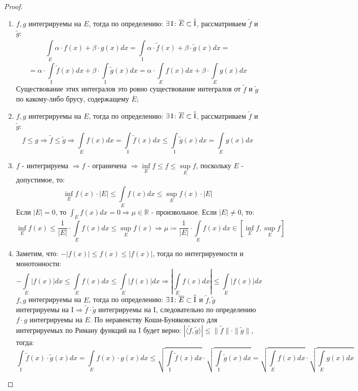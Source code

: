 \documentclass[12pt]{article}
\newcommand{\MR}{\mathbb{R}}
\newcommand{\MI}{\mathrm{I}}
\theoremstyle{definition}
\newcommand{\ddint}[2]{\displaystyle\int\limits_{#1}^{#2}}
\newcommand{\wte}[1]{\widetilde{#1}}
\newcommand{\ovl}[1]{\overline{#1}}
\newcommand{\Circ}[1]{\accentset{\circ}{#1}}
\begin{document}
\begin{proof}\hfill
	\begin{enumerate}[label=\arabic*)]
		\item $f,g$ интегрируемы на $E$, тогда по определению: $\exists \, \MI \colon \ovl{E} \subset \Circ{\MI}$, рассматриваем $\wte{f}$ и $\wte{g}$:
		$$
			\ddint{E}{}\alpha{\cdot}f(x) + \beta{\cdot}g(x)dx = \ddint{\MI}{}\alpha{\cdot}\wte{f}(x) + \beta{\cdot}\wte{g}(x)dx =  
		$$
		$$
			= \alpha{\cdot}\ddint{\MI}{}\wte{f}(x)dx + \beta{\cdot}\ddint{\MI}{}\wte{g}(x)dx = \alpha{\cdot} \ddint{E}{}f(x)dx + \beta {\cdot}\ddint{E}{}g(x)dx
		$$
		Существование этих интегралов это ровно существование интегралов от $\wte{f}$ и $\wte{g}$ по какому-либо брусу, содержащему $\ovl{E}$;
		\item  $f,g$ интегрируемы на $E$, тогда по определению: $\exists \, \MI \colon \ovl{E} \subset \Circ{\MI}$, рассматриваем $\wte{f}$ и $\wte{g}$:
		$$
			f\leq g \Rightarrow \wte{f} \leq \wte{g} \Rightarrow \ddint{E}{}f(x)dx =  \ddint{\MI}{}\wte{f}(x)dx \leq \ddint{\MI}{}\wte{g}(x)dx = \ddint{E}{}g(x)dx
		$$
		\item $f$ - интегрируема $\Rightarrow f$ - ограничена $\Rightarrow \inf\limits_E f \leq f \leq \sup\limits_E f$, поскольку $E$ - допустимое, то:
		$$
			\inf\limits_E f(x){\cdot}|E| \leq \ddint{E}{}f(x)dx \leq  \sup\limits_E f(x){\cdot}|E|
		$$
		Если $|E| = 0$, то $\int_E f(x)dx = 0 \Rightarrow \mu \in \MR$ - произвольное. Если $|E| \neq 0$, то:
		$$
			\inf\limits_E f(x) \leq \dfrac{1}{|E|}{\cdot}\ddint{E}{}f(x)dx \leq  \sup\limits_E f(x) \Rightarrow \mu \coloneqq \dfrac{1}{|E|}{\cdot}\ddint{E}{}f(x)dx \in [\inf\limits_{E}f, \sup\limits_{E}f]
		$$
		\item Заметим, что: $-|f(x)| \leq f(x) \leq |f(x)|$, тогда по интегрируемости и монотонности:
		$$
			-\ddint{E}{}|f(x)|dx \leq \ddint{E}{}f(x)dx \leq \ddint{E}{}|f(x)|dx \Rightarrow \left|\ddint{E}{}f(x)dx \right| \leq \ddint{E}{}|f(x)|dx
		$$
		$f,g$ интегрируемы на $E$, тогда по определению: $\exists \, \MI \colon \ovl{E} \subset \Circ{\MI}$ и $\wte{f}, \wte{g}$ интегрируемы на $\MI \Rightarrow \wte{f}{\cdot}\wte{g}$ интегрируемы на $\MI$, следовательно по определению $f{\cdot}g$ интегрируемы на $E$. По неравенству Коши-Буняковского для интегрируемых по Риману функций на $\MI$ будет верно: $|\langle\wte{f},\wte{g}\rangle| \leq \|\wte{f}\|{\cdot}\|\wte{g}\|$, тогда:
		$$
			\ddint{\MI}{}\wte{f}(x){\cdot}\wte{g}(x)dx = \ddint{E}{}f(x){\cdot}g(x)dx \leq \sqrt{\ddint{\MI}{}\wte{f}(x)dx}{\cdot}\sqrt{\ddint{\MI}{}\wte{g}(x)dx} = \sqrt{\ddint{E}{}f(x)dx}{\cdot}\sqrt{\ddint{E}{}g(x)dx}
		$$
	\end{enumerate}
\end{proof}
\end{document}
